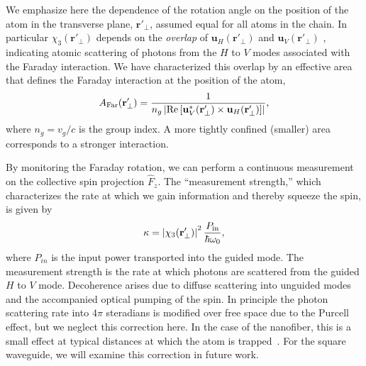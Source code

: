 \documentclass[preprint,aps,pra,onecolumn,superscriptaddress]{revtex4-1} %
\newcommand{\mbf}[1]{\mathbf{#1}}
\newcommand{\AF}{A_{\rm Far}} %
\begin{document}
We emphasize here the dependence of the rotation angle on the position of the atom in the transverse plane, $\mbf{r}'_\perp$, assumed equal for all atoms in the chain.  In particular $\chi_3(\mbf{r}'_\perp)$ depends on the {\em overlap} of $\mbf{u}_H (\mbf{r}'_\perp)$ and $\mbf{u}_V (\mbf{r}'_\perp)$ , indicating atomic scattering of photons from the $H$ to $V$ modes associated with the Faraday interaction.  We have characterized this overlap by an effective area that defines the Faraday interaction at the position of the atom,
\begin{equation}\label{eq:AFar}
\AF(\mbf{r}'_\perp) = \frac{1}{n_g \left\vert \text{Re} \left[ \mbf{u}^*_V (\mbf{r}'_\perp) \times \mbf{u}_H (\mbf{r}'_\perp) \right]\right\vert},
\end{equation}
where $n_g = v_g/c$ is the group index.  A more tightly confined (smaller) area corresponds to a stronger interaction.

By monitoring the Faraday rotation, we can perform a continuous measurement on the collective spin projection $\hat{F}_z$.  The ``measurement strength,'' which characterizes the rate at which we gain information and thereby squeeze the spin, is given by
\begin{equation}\label{eq:kappa}
\kappa = \left\vert \chi_3(\mbf{r}'_\perp) \right\vert^2 \frac{P_{\rm in}}{\hbar \omega_0},
\end{equation}
where $P_{in}$ is the input power transported into the guided mode.  The measurement strength is the rate at which photons are scattered from the guided $H$ to $V$ mode.  Decoherence arises due to diffuse scattering into unguided modes and the accompanied optical pumping of the spin.  In principle the photon scattering rate into $4\pi$ steradians is modified over free space due to the Purcell effect, but we neglect this correction here.  In the case of the nanofiber, this is a small effect at typical distances at which the atom is trapped~\cite{LeKien2005,Kien2008}.  For the square waveguide, we will examine this correction in future work.  
\end{document}

